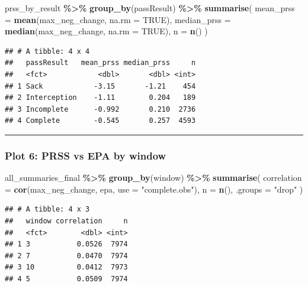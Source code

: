 \documentclass[
]{article}
\newenvironment{Shaded}{\begin{snugshade}}{\end{snugshade}}
\newcommand{\AttributeTok}[1]{\textcolor[rgb]{0.13,0.29,0.53}{#1}}
\newcommand{\ConstantTok}[1]{\textcolor[rgb]{0.56,0.35,0.01}{#1}}
\newcommand{\FunctionTok}[1]{\textcolor[rgb]{0.13,0.29,0.53}{\textbf{#1}}}
\newcommand{\NormalTok}[1]{#1}
\newcommand{\SpecialCharTok}[1]{\textcolor[rgb]{0.81,0.36,0.00}{\textbf{#1}}}
\newcommand{\StringTok}[1]{\textcolor[rgb]{0.31,0.60,0.02}{#1}}
\begin{document}
\begin{Shaded}
\begin{Highlighting}[]
\NormalTok{prss\_by\_result }\SpecialCharTok{\%\textgreater{}\%}
  \FunctionTok{group\_by}\NormalTok{(passResult) }\SpecialCharTok{\%\textgreater{}\%}
  \FunctionTok{summarise}\NormalTok{(}
    \AttributeTok{mean\_prss   =} \FunctionTok{mean}\NormalTok{(max\_neg\_change,   }\AttributeTok{na.rm =} \ConstantTok{TRUE}\NormalTok{),}
    \AttributeTok{median\_prss =} \FunctionTok{median}\NormalTok{(max\_neg\_change, }\AttributeTok{na.rm =} \ConstantTok{TRUE}\NormalTok{),}
    \AttributeTok{n           =} \FunctionTok{n}\NormalTok{()}
\NormalTok{  )}
\end{Highlighting}
\end{Shaded}

\begin{verbatim}
## # A tibble: 4 x 4
##   passResult   mean_prss median_prss     n
##   <fct>            <dbl>       <dbl> <int>
## 1 Sack            -3.15       -1.21    454
## 2 Interception    -1.11        0.204   189
## 3 Incomplete      -0.992       0.210  2736
## 4 Complete        -0.545       0.257  4593
\end{verbatim}

\begin{center}\rule{0.5\linewidth}{0.5pt}\end{center}

\subsubsection{Plot 6: PRSS vs EPA by
window}\label{plot-6-prss-vs-epa-by-window}

\begin{Shaded}
\begin{Highlighting}[]
\NormalTok{all\_summaries\_final }\SpecialCharTok{\%\textgreater{}\%}
  \FunctionTok{group\_by}\NormalTok{(window) }\SpecialCharTok{\%\textgreater{}\%}
  \FunctionTok{summarise}\NormalTok{(}
    \AttributeTok{correlation =} \FunctionTok{cor}\NormalTok{(max\_neg\_change, epa, }\AttributeTok{use =} \StringTok{"complete.obs"}\NormalTok{),}
    \AttributeTok{n           =} \FunctionTok{n}\NormalTok{(),}
    \AttributeTok{.groups     =} \StringTok{"drop"}
\NormalTok{  )}
\end{Highlighting}
\end{Shaded}

\begin{verbatim}
## # A tibble: 4 x 3
##   window correlation     n
##   <fct>        <dbl> <int>
## 1 3           0.0526  7974
## 2 7           0.0470  7974
## 3 10          0.0412  7973
## 4 5           0.0509  7974
\end{verbatim}
\end{document}

